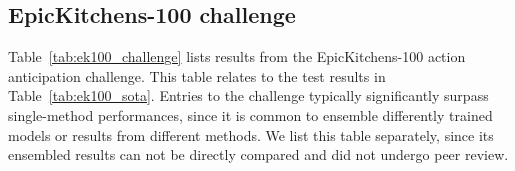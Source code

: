 \documentclass[10pt,twocolumn,letterpaper,dvipsnames]{article}
\begin{document}
\begin{table}[hbtp!]
    \centering
    \setlength\tabcolsep{1.5pt}
    \caption{Current leaders in the EpicKitchens-100 action anticipation challenge. The numbers in bold-face indicate the highest score.}
    \label{tab:ek100_challenge}
\end{table} 
\subsection{EpicKitchens-100 challenge}

Table~\ref{tab:ek100_challenge} lists results from the EpicKitchens-100 action anticipation challenge. This table relates to the test results in Table~\ref{tab:ek100_sota}. Entries to the challenge typically significantly surpass single-method performances, since it is common to ensemble differently trained models or results from different methods. We list this table separately, since its ensembled results can not be directly compared and did not undergo peer review.
\end{document}
